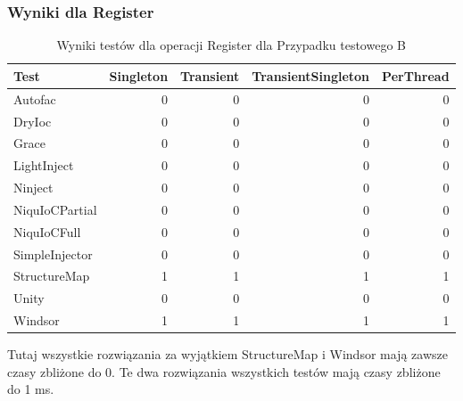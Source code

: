 \documentclass[12pt]{article}
\begin{document}
\subsubsection{Wyniki dla Register}
\begin{table}[H]
\captionsetup{belowskip=0pt,aboveskip=0pt}
\begin{center}
\begin{small}
	\begin{tabular}{ | l | r | r | r | r | }
    		\hline
Test & Singleton & Transient & TransientSingleton & PerThread \\ \hline
Autofac & 0 & 0 & 0 & 0 \\ \hline
DryIoc & 0 & 0 & 0 & 0 \\ \hline
Grace & 0 & 0 & 0 & 0 \\ \hline
LightInject & 0 & 0 & 0 & 0 \\ \hline
Ninject & 0 & 0 & 0 & 0 \\ \hline
NiquIoCPartial & 0 & 0 & 0 & 0 \\ \hline
NiquIoCFull & 0 & 0 & 0 & 0 \\ \hline
SimpleInjector & 0 & 0 & 0 & 0 \\ \hline
StructureMap & 1 & 1 & 1 & 1 \\ \hline
Unity & 0 & 0 & 0 & 0 \\ \hline
Windsor & 1 & 1 & 1 & 1 \\ \hline
  	\end{tabular}
\end{small}
\end{center}
\caption{Wyniki testów dla operacji Register dla Przypadku testowego B}
\label{TestCaseB_Register}
\end{table}
Tutaj wszystkie rozwiązania za wyjątkiem StructureMap i Windsor mają zawsze czasy zbliżone do 0. Te dwa rozwiązania wszystkich testów mają czasy zbliżone do 1 ms.
\end{document}
